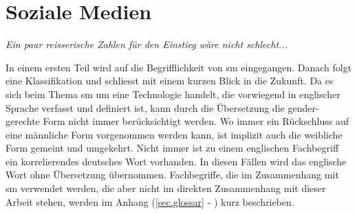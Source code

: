 %
%

\chapter{Soziale Medien}\label{chap.sm}
\glsresetall
\textit{Ein paar reisserische Zahlen für den Einstieg wäre nicht schlecht...}\par 

In einem ersten Teil wird auf die Begrifflichkeit von \gls{sm} eingegangen. Danach folgt eine Klassifikation und schliesst mit einem kurzen Blick in die Zukunft.\newline
Da es sich beim Thema \gls{sm} um eine Technologie handelt, die vorwiegend in englischer Sprache verfasst und definiert ist, kann durch die Übersetzung die gender-gerechte Form nicht immer berücksichtigt werden. Wo immer ein Rückschluss auf eine männliche Form vorgenommen werden kann, ist implizit auch die weibliche Form gemeint und umgekehrt.  Nicht immer ist zu einem englischen Fachbegriff ein korrelierendes deutsches Wort vorhanden. In diesen Fällen wird das englische Wort ohne Übersetzung übernommen.\newline
Fachbegriffe, die im Zusammenhang mit \gls{sm} verwendet werden, die aber nicht im direkten Zusammenhang mit dieser Arbeit stehen, werden im Anhang (\ref{sec.glossar} - ) kurz beschrieben.
